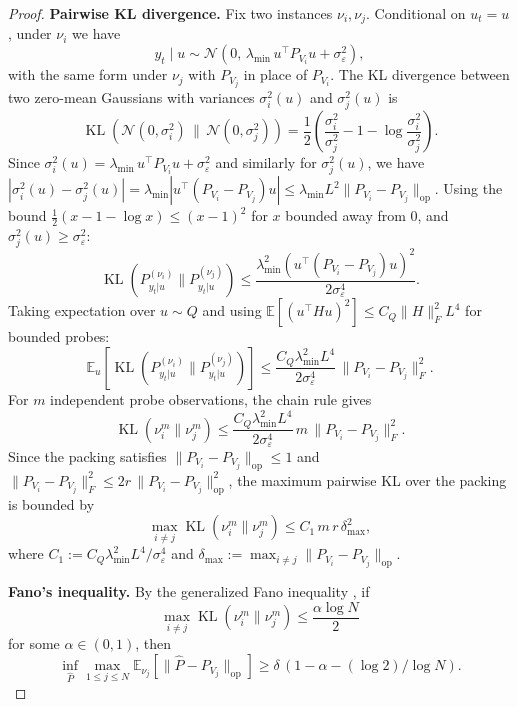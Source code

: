 \documentclass{article}
\newcommand{\E}{\mathbb{E}}
\newcommand{\op}{\mathrm{op}}
\DeclareMathOperator{\KL}{KL}
\begin{document}
\begin{proof}
\textbf{Pairwise KL divergence.}
Fix two instances $\nu_i, \nu_j$.  Conditional on $u_t = u$, under $\nu_i$ we have
\[
y_t \mid u \sim \mathcal{N}\!\left(0,\, \lambda_{\min}\, u^\top P_{V_i} u + \sigma_\varepsilon^2\right),
\]
with the same form under $\nu_j$ with $P_{V_j}$ in place of $P_{V_i}$.  The KL divergence between two zero-mean Gaussians with variances $\sigma_i^2(u)$ and $\sigma_j^2(u)$ is
\[
\KL\!\left(\mathcal{N}(0, \sigma_i^2) \,\|\, \mathcal{N}(0, \sigma_j^2)\right)
= \frac{1}{2}\left(\frac{\sigma_i^2}{\sigma_j^2} - 1 - \log\frac{\sigma_i^2}{\sigma_j^2}\right).
\]
Since $\sigma_i^2(u) = \lambda_{\min}\, u^\top P_{V_i} u + \sigma_\varepsilon^2$ and similarly for $\sigma_j^2(u)$, we have $|\sigma_i^2(u) - \sigma_j^2(u)| = \lambda_{\min} |u^\top(P_{V_i} - P_{V_j})u| \le \lambda_{\min} L^2 \|P_{V_i} - P_{V_j}\|_{\op}$.  Using the bound $\frac{1}{2}(x - 1 - \log x) \le (x-1)^2$ for $x$ bounded away from $0$, and $\sigma_j^2(u) \ge \sigma_\varepsilon^2$:
\[
\KL(P_{y_t|u}^{(\nu_i)} \| P_{y_t|u}^{(\nu_j)})
\le \frac{\lambda_{\min}^2 (u^\top(P_{V_i} - P_{V_j})u)^2}{2\sigma_\varepsilon^4}.
\]
Taking expectation over $u \sim Q$ and using $\E[(u^\top H u)^2] \le C_Q \|H\|_F^2 L^4$ for bounded probes:
\[
\E_u\!\left[\KL(P_{y_t|u}^{(\nu_i)} \| P_{y_t|u}^{(\nu_j)})\right]
\le \frac{C_Q \lambda_{\min}^2 L^4}{2\sigma_\varepsilon^4}\, \|P_{V_i} - P_{V_j}\|_F^2.
\]
For $m$ independent probe observations, the chain rule gives
\begin{equation}
\KL(\nu_i^m \| \nu_j^m) \le \frac{C_Q \lambda_{\min}^2 L^4}{2\sigma_\varepsilon^4}\, m\, \|P_{V_i} - P_{V_j}\|_F^2.
\label{eq:kl_bound}
\end{equation}
Since the packing satisfies $\|P_{V_i} - P_{V_j}\|_{\op} \le 1$ and $\|P_{V_i} - P_{V_j}\|_F^2 \le 2r\, \|P_{V_i} - P_{V_j}\|_{\op}^2$, the maximum pairwise KL over the packing is bounded by
\begin{equation}
\max_{i \neq j} \KL(\nu_i^m \| \nu_j^m) \le C_1\, m\, r\, \delta_{\max}^2,
\label{eq:kl_max}
\end{equation}
where $C_1 := C_Q \lambda_{\min}^2 L^4 / \sigma_\varepsilon^4$ and $\delta_{\max} := \max_{i \neq j} \|P_{V_i} - P_{V_j}\|_{\op}$.

\textbf{Fano's inequality.}
By the generalized Fano inequality \citep[Theorem~2.7]{tsybakov2009introduction}, if
\begin{equation}
\max_{i \neq j} \KL(\nu_i^m \| \nu_j^m) \le \frac{\alpha \log N}{2}
\label{eq:fano_condition}
\end{equation}
for some $\alpha \in (0, 1)$, then
\[
\inf_{\widehat{P}} \max_{1 \le j \le N} \E_{\nu_j}\!\left[\|\widehat{P} - P_{V_j}\|_{\op}\right]
\ge \delta\, (1 - \alpha - (\log 2) / \log N).
\]


\end{proof}
\end{document}
